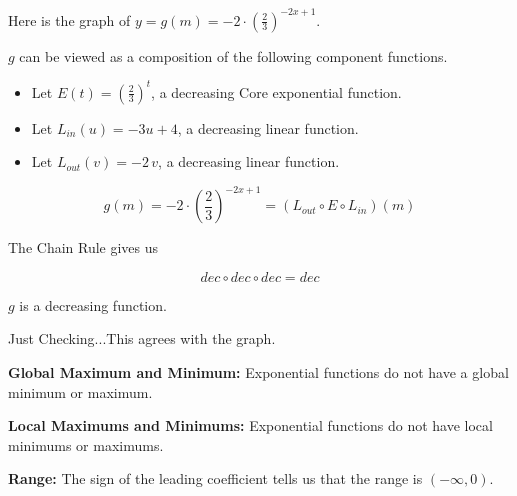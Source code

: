 \documentclass{ximera}
\begin{document}
\begin{example}



Here is the graph of $y = g(m) = -2 \cdot \left( \frac{2}{3} \right)^{-2x+1}$.

\begin{image}
\end{image}



$g$ can be viewed as a composition of the following component functions.




\begin{itemize}
\item Let $E(t) = \left( \frac{2}{3} \right)^t$, a decreasing Core exponential function.
\item Let $L_{in}(u) = -3u+4 $, a decreasing linear function.
\item Let $L_{out}(v) = -2 \, v $, a decreasing linear function.
\end{itemize}



\[  g(m) = -2 \cdot \left( \frac{2}{3} \right)^{-2x+1} = (L_{out} \circ E \circ L_{in})(m) \]

The Chain Rule gives us


\[ dec \circ dec \circ dec = dec  \]

$g$ is a decreasing function.


Just Checking...This agrees with the graph.




\textbf{Global Maximum and Minimum:} Exponential functions do not have a global minimum or maximum.




\textbf{Local Maximums and Minimums:} Exponential functions do not have local minimums or maximums.


\textbf{Range:} The sign of the leading coefficient tells us that the range is $(-\infty, 0)$.







\end{example}
\end{document}
